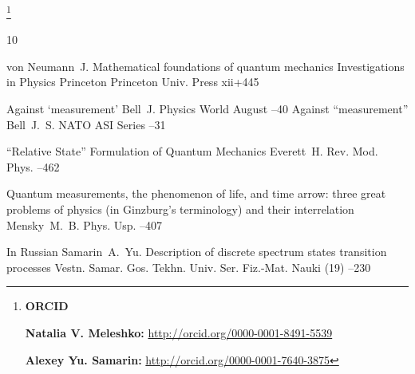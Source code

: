 \RuDate


\newpage



\makeentitle



\thanks{{\bf ORCID}

{\bf Natalia V. Meleshko:} \url{http://orcid.org/0000-0001-8491-5539}

{\bf Alexey Yu. Samarin:} \url{http://orcid.org/0000-0001-7640-3875}

}


\EngRef

\pagebreak


\begin{thebibliography}{10}


\by von Neumann~J.
\book Mathematical foundations of quantum mechanics
\serial Investigations in Physics 
\publ Princeton
\publaddr Princeton Univ. Press
\totalpages xii+445 

\paper Against `measurement'
\by Bell~J.
\jour Physics World
\issueinfo August
--40
\moreref
\paper Against ``measurement''
\by Bell~J.~S.
\jour NATO ASI Series 
--31


\paper ``Relative State'' Formulation of Quantum Mechanics
\by Everett~H.
\jour Rev. Mod. Phys.
--462 


\paper Quantum measurements, the phenomenon of life, and time arrow: three great problems of physics (in Ginzburg's terminology) and their interrelation
\by Mensky~M.~B.
\jour Phys. Usp.
--407



\lang In Russian
\by Samarin~A.~Yu.
\paper Description of discrete spectrum states transition processes
\jour Vestn. Samar. Gos. Tekhn. Univ. Ser. Fiz.-Mat. Nauki
(19)
--230



\end{thebibliography}
